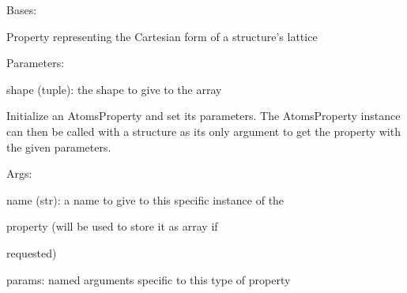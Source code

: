 \documentclass[letterpaper,10pt,english]{sphinxmanual}
\begin{document}
\begin{fulllineitems}
\label{doctree/soprano.properties.basic.basic:soprano.properties.basic.basic.LatticeCart}
Bases: {\hyperref[doctree/soprano.properties.atomsproperty:soprano.properties.atomsproperty.AtomsProperty]{}}

Property representing the Cartesian form of a structure's lattice

\begin{DUlineblock}{0em}
\item[] Parameters:
\item[]
\begin{DUlineblock}{\DUlineblockindent}
\item[] shape (tuple): the shape to give to the array
\end{DUlineblock}
\end{DUlineblock}

Initialize an AtomsProperty and set its parameters.
The AtomsProperty instance can then be called with a structure as its
only argument to get the property with the given parameters.

\begin{DUlineblock}{0em}
\item[] Args:
\item[]
\begin{DUlineblock}{\DUlineblockindent}
\item[] name (str): a name to give to this specific instance of the
\item[]
\begin{DUlineblock}{\DUlineblockindent}
\item[] property (will be used to store it as array if
\item[] requested)
\end{DUlineblock}
\item[] params: named arguments specific to this type of property
\end{DUlineblock}
\end{DUlineblock}

\begin{fulllineitems}
\label{doctree/soprano.properties.basic.basic:soprano.properties.basic.basic.LatticeCart.default_name}
\end{fulllineitems}


\end{fulllineitems}
\end{document}
